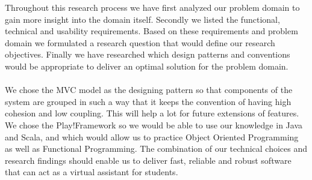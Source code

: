 Throughout this research process we have first analyzed our problem domain to gain more insight into the domain itself. Secondly we listed the functional, technical and usability requirements. Based on these requirements and problem domain we formulated a research question that would define our research objectives. Finally we have researched which design patterns and conventions would be appropriate to deliver an optimal solution for the problem domain.\\\\
We chose the MVC model as the designing pattern so that components of the system are grouped in such a way that it keeps the convention of having high cohesion and low coupling. This will help a lot for future extensions of features. We chose the Play!Framework so we would be able to use our knowledge in Java and Scala, and which would allow us to practice Object Oriented Programming as well as Functional Programming. The combination of our technical choices and research findings should enable us to deliver fast, reliable and robust software that can act as a virtual assistant for students.

